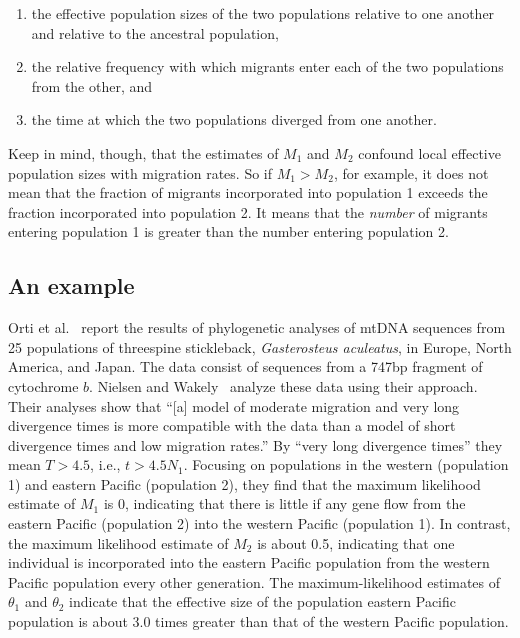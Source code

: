 \begin{enumerate}

\item the effective population sizes of the two populations relative
  to one another and relative to the ancestral population, 

\item the relative frequency with which migrants enter each of the two
  populations from the other, and 

\item the time at which the two populations diverged from one another.

\end{enumerate}

\noindent Keep in mind, though, that the estimates of $M_1$ and $M_2$
confound local effective population sizes with migration rates. So if
$M_1 > M_2$, for example, it does not mean that the fraction of
migrants incorporated into population 1 exceeds the fraction
incorporated into population 2. It means that the {\it number\/} of
migrants entering population 1 is greater than the number entering
population 2.

\subsection*{An example}

Orti et al.~\cite{Orti-etal-1994} report the results of phylogenetic
analyses of mtDNA sequences from 25 populations of threespine
stickleback, {\it Gasterosteus aculeatus}, in Europe, North America,
and Japan. The data consist of sequences from a 747bp fragment of
cytochrome $b$. Nielsen and Wakely~\cite{Nielsen-Wakeley-2001} analyze
these data using their approach. Their analyses show that ``[a] model
of moderate migration and very long divergence times is more
compatible with the data than a model of short divergence times and
low migration rates.'' By ``very long divergence times'' they mean $T
> 4.5$, i.e., $t > 4.5N_1$. Focusing on populations in the western
(population 1) and eastern Pacific (population 2), they find that the
maximum likelihood estimate of $M_1$ is 0, indicating that there is
little if any gene flow from the eastern Pacific (population 2) into
the western Pacific (population 1). In contrast, the maximum
likelihood estimate of $M_2$ is about 0.5, indicating that one
individual is incorporated into the eastern Pacific population from
the western Pacific population every other generation. The
maximum-likelihood estimates of $\theta_1$ and $\theta_2$ indicate
that the effective size of the population eastern Pacific population
is about 3.0 times greater than that of the western Pacific
population.

